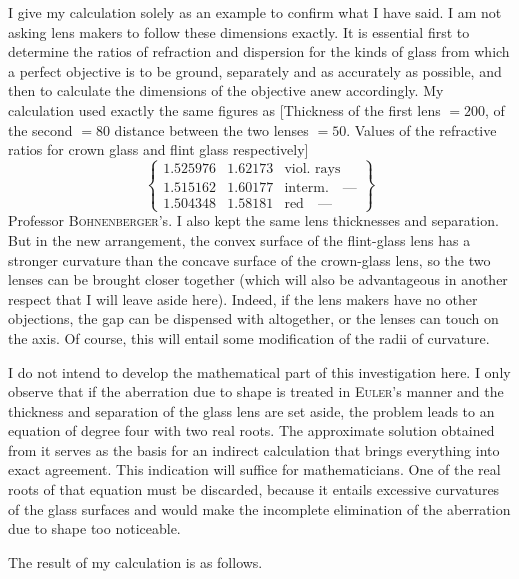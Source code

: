 I give my calculation solely as an example to confirm what I have said. I am not asking lens makers to follow these dimensions exactly. It is essential first to determine the ratios of refraction and dispersion for the kinds of glass from which a perfect objective is to be ground, separately and as accurately as possible, and then to calculate the dimensions of the objective anew accordingly. My calculation used exactly the same figures as
\expandafter\def\csname HistoricalNoteText513\endcsname{[Thickness of the first lens $=200$, of the second $=80$ distance between the two lenses $=50$. Values of the refractive ratios for crown glass and flint glass respectively]
\[
\left\{\begin{array}{lll}
1.525976&1.62173&\text{viol. rays}\\
1.515162&1.60177&\text{interm.}\quad\text{—}\\
1.504348&1.58181&\text{red}\quad\text{—}
\end{array}\right\}
\]
}Professor \textsc{Bohnenberger}'s. I also kept the same lens thicknesses and separation. But in the new arrangement, the convex surface of the flint-glass lens has a stronger curvature than the concave surface of the crown-glass lens, so the two lenses can be brought closer together (which will also be advantageous in another respect that I will leave aside here). Indeed, if the lens makers have no other objections, the gap can be dispensed with altogether, or the lenses can touch on the axis. Of course, this will entail some modification of the radii of curvature.

I do not intend to develop the mathematical part of this investigation here. I only observe that if the aberration due to shape is treated in \textsc{Euler}'s manner and the thickness and separation of the glass lens are set aside, the problem leads to an equation of degree four with two real roots. The approximate solution obtained from it serves as the basis for an indirect calculation that brings everything into exact agreement. This indication will suffice for mathematicians. One of the real roots of that equation must be discarded, because it entails excessive curvatures of the glass surfaces and would make the incomplete elimination of the aberration due to shape too noticeable.

The result of my calculation is as follows.

